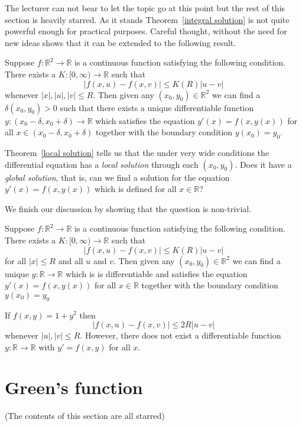 The lecturer can not bear to let the topic go at 
this point but the rest of this section is heavily
starred.
As it stands Theorem~\ref{integral solution} is not
quite powerful enough for practical purposes. 
Careful thought, without the need for new ideas
shows that it can be extended to the following                              
result. 
\begin{theorem}\label{local solution}
Suppose $f:{\mathbb R}^{2}\rightarrow{\mathbb R}$
is a continuous function satisfying the following condition.
There exists a $K:[0,\infty)\rightarrow{\mathbb R}$
such that 
\[|f(x,u)-f(x,v)|\leq K(R) |u-v| \]
whenever $|x|,|u|,|v|\leq R$.
Then given any $(x_{0},y_{0})\in{\mathbb R}^{2}$
we can find a $\delta(x_{0},y_{0})>0$ such that there
exists a unique differentiable function
$y:(x_{0}-\delta,x_{0}+\delta)\rightarrow{\mathbb R}$
which satisfies the equation $y'(x)=f(x,y(x))$
for all $x\in (x_{0}-\delta,x_{0}+\delta)$ together
with the boundary condition $y(x_{0})=y_{0}$.
\end{theorem}
Theorem~\ref{local solution} tells us that the
under very wide conditions the differential
equation has a \emph{local solution} through each
$(x_{0},y_{0})$. Does it have a \emph{global solution}, 
that is, can we find a solution for
the equation $y'(x)=f(x,y(x))$ which is defined for all 
$x\in{\mathbb R}$?

We finish our discussion by showing that the question
is non-trivial.
\begin{theorem}\label{nice global}
Suppose $f:{\mathbb R}^{2}\rightarrow{\mathbb R}$
is a continuous function satisfying the following condition.
There exists a $K:[0,\infty)\rightarrow{\mathbb R}$
such that
\[|f(x,u)-f(x,v)|\leq K(R) |u-v| \]
for all $|x|\leq R$ and all $u$ and $v$.
Then given any $(x_{0},y_{0})\in{\mathbb R}^{2}$
we can find 
a unique $y:{\mathbb R}\rightarrow{\mathbb R}$
which is
is differentiable and satisfies the equation $y'(x)=f(x,y(x))$
for all $x\in {\mathbb R}$ together
with the boundary condition $y(x_{0})=y_{0}$
\end{theorem}

\begin{example} If $f(x,y)=1+y^{2}$ then
\[|f(x,u)-f(x,v)|\leq 2R |u-v| \]
whenever $|u|,|v|\leq R$. However, there does not exist
a differentiable function $y:{\mathbb R}\rightarrow{\mathbb R}$
with $y'=f(x,y)$ for all $x$.
\end{example}
\section{Green's function} (The contents of this section are
all starred)

